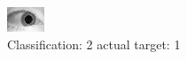 \begin{figure}[h!]
\begin{center}
\includegraphics[width=0.60\columnwidth]{figures/ID1493_class_2_target_1.png}
\end{center}
\caption{ Classification: 2 actual target: 1}
\label{fig:ID1493_class_2_target_1}
\end{figure}
